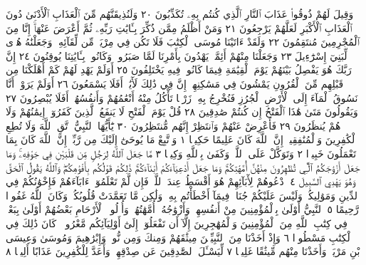 وَقِيلَ لَهُمْ ذُوقُوا۟ عَذَابَ ٱلنَّارِ ٱلَّذِي كُنتُم بِهِۦ تُكَذِّبُونَ ٢٠
وَلَنُذِيقَنَّهُم مِّنَ ٱلْعَذَابِ ٱلْأَدْنَىٰ دُونَ ٱلْعَذَابِ ٱلْأَكْبَرِ
لَعَلَّهُمْ يَرْجِعُونَ ٢١ وَمَنْ أَظْلَمُ مِمَّن ذُكِّرَ بِـَٔايَٰتِ
رَبِّهِۦ ثُمَّ أَعْرَضَ عَنْهَآۚ إِنَّا مِنَ ٱلْمُجْرِمِينَ مُنتَقِمُونَ ٢٢
وَلَقَدْ ءَاتَيْنَا مُوسَى ٱلْكِتَٰبَ فَلَا تَكُن فِي مِرْيَةࣲ
مِّن لِّقَآئِهِۦۖ وَجَعَلْنَٰهُ هُدࣰى لِّبَنِيٓ إِسْرَٰٓءِيلَ ٢٣
وَجَعَلْنَا مِنْهُمْ أَئِمَّةࣰ يَهْدُونَ بِأَمْرِنَا لَمَّا صَبَرُوا۟ۖ
وَكَانُوا۟ بِـَٔايَٰتِنَا يُوقِنُونَ ٢٤ إِنَّ رَبَّكَ هُوَ يَفْصِلُ بَيْنَهُمْ
يَوْمَ ٱلْقِيَٰمَةِ فِيمَا كَانُوا۟ فِيهِ يَخْتَلِفُونَ ٢٥ أَوَلَمْ يَهْدِ لَهُمْ
كَمْ أَهْلَكْنَا مِن قَبْلِهِم مِّنَ ٱلْقُرُونِ يَمْشُونَ
فِي مَسَٰكِنِهِمْۚ إِنَّ فِي ذَٰلِكَ لَأٓيَٰتٍۚ أَفَلَا يَسْمَعُونَ ٢٦
أَوَلَمْ يَرَوْا۟ أَنَّا نَسُوقُ ٱلْمَآءَ إِلَى ٱلْأَرْضِ ٱلْجُرُزِ فَنُخْرِجُ بِهِۦ
زَرْعࣰا تَأْكُلُ مِنْهُ أَنْعَٰمُهُمْ وَأَنفُسُهُمْۚ أَفَلَا يُبْصِرُونَ ٢٧
وَيَقُولُونَ مَتَىٰ هَٰذَا ٱلْفَتْحُ إِن كُنتُمْ صَٰدِقِينَ ٢٨
قُلْ يَوْمَ ٱلْفَتْحِ لَا يَنفَعُ ٱلَّذِينَ كَفَرُوٓا۟ إِيمَٰنُهُمْ وَلَا هُمْ
يُنظَرُونَ ٢٩ فَأَعْرِضْ عَنْهُمْ وَٱنتَظِرْ إِنَّهُم مُّنتَظِرُونَ ٣٠
يَٰٓأَيُّهَا ٱلنَّبِيُّ ٱتَّقِ ٱللَّهَ وَلَا تُطِعِ ٱلْكَٰفِرِينَ وَٱلْمُنَٰفِقِينَۚ إِنَّ ٱللَّهَ
كَانَ عَلِيمًا حَكِيمࣰا ١ وَٱتَّبِعْ مَا يُوحَىٰٓ إِلَيْكَ مِن رَّبِّكَۚ
إِنَّ ٱللَّهَ كَانَ بِمَا تَعْمَلُونَ خَبِيرࣰا ٢ وَتَوَكَّلْ عَلَى ٱللَّهِۚ
وَكَفَىٰ بِٱللَّهِ وَكِيلࣰا ٣ مَّا جَعَلَ ٱللَّهُ لِرَجُلࣲ مِّن قَلْبَيْنِ فِي جَوْفِهِۦۚ
وَمَا جَعَلَ أَزْوَٰجَكُمُ ٱلَّٰٓـِٔي تُظَٰهِرُونَ مِنْهُنَّ أُمَّهَٰتِكُمْۚ وَمَا جَعَلَ
أَدْعِيَآءَكُمْ أَبْنَآءَكُمْۚ ذَٰلِكُمْ قَوْلُكُم بِأَفْوَٰهِكُمْۖ وَٱللَّهُ يَقُولُ ٱلْحَقَّ
وَهُوَ يَهْدِي ٱلسَّبِيلَ ٤ ٱدْعُوهُمْ لِأٓبَآئِهِمْ هُوَ أَقْسَطُ عِندَ ٱللَّهِۚ
فَإِن لَّمْ تَعْلَمُوٓا۟ ءَابَآءَهُمْ فَإِخْوَٰنُكُمْ فِي ٱلدِّينِ وَمَوَٰلِيكُمْۚ وَلَيْسَ
عَلَيْكُمْ جُنَاحࣱ فِيمَآ أَخْطَأْتُم بِهِۦ وَلَٰكِن مَّا تَعَمَّدَتْ قُلُوبُكُمْۚ
وَكَانَ ٱللَّهُ غَفُورࣰا رَّحِيمًا ٥ ٱلنَّبِيُّ أَوْلَىٰ بِٱلْمُؤْمِنِينَ مِنْ أَنفُسِهِمْۖ
وَأَزْوَٰجُهُۥٓ أُمَّهَٰتُهُمْۗ وَأُو۟لُوا۟ ٱلْأَرْحَامِ بَعْضُهُمْ أَوْلَىٰ بِبَعْضࣲ
فِي كِتَٰبِ ٱللَّهِ مِنَ ٱلْمُؤْمِنِينَ وَٱلْمُهَٰجِرِينَ إِلَّآ أَن تَفْعَلُوٓا۟ إِلَىٰٓ
أَوْلِيَآئِكُم مَّعْرُوفࣰاۚ كَانَ ذَٰلِكَ فِي ٱلْكِتَٰبِ مَسْطُورࣰا ٦
وَإِذْ أَخَذْنَا مِنَ ٱلنَّبِيِّـۧنَ مِيثَٰقَهُمْ وَمِنكَ وَمِن نُّوحࣲ وَإِبْرَٰهِيمَ
وَمُوسَىٰ وَعِيسَى ٱبْنِ مَرْيَمَۖ وَأَخَذْنَا مِنْهُم مِّيثَٰقًا غَلِيظࣰا ٧
لِّيَسْـَٔلَ ٱلصَّٰدِقِينَ عَن صِدْقِهِمْۚ وَأَعَدَّ لِلْكَٰفِرِينَ عَذَابًا أَلِيمࣰا ٨
